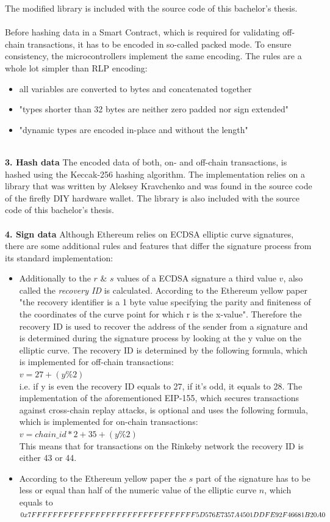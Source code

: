 The modified library is included with the source code of this bachelor's thesis.
\\\\
Before hashing data in a Smart Contract, which is required for validating off-chain transactions, it has to be encoded in so-called packed mode\cite{packed-spec}. To ensure consistency, the microcontrollers implement the same encoding. The rules are a whole lot simpler than RLP encoding:
\begin{itemize}
  \item all variables are converted to bytes and concatenated together
  \item "types shorter than 32 bytes are neither zero padded nor sign extended"
  \item "dynamic types are encoded in-place and without the length"
\end{itemize}
\leavevmode
\\
\textbf{3. Hash data}
The encoded data of both, on- and off-chain transactions, is hashed using the Keccak-256 hashing algorithm. The implementation relies on a library that was written by Aleksey Kravchenko and was found in the source code of the firefly DIY hardware wallet\cite{keccak-source}. The library is also included with the source code of this bachelor's thesis.
\\\\
\textbf{4. Sign data}
Although Ethereum relies on ECDSA elliptic curve signatures, there are some additional rules and features that differ the signature process from its standard implementation:
\begin{itemize}
  \item Additionally to the $r$ \& $s$ values of a ECDSA signature a third value $v$, also called the \textit{recovery ID} is calculated. According to the Ethereum yellow paper\cite{ethereum-yellow-paper} "the recovery identifier is a 1 byte value specifying the parity and finiteness of the coordinates of the curve point for which r is the x-value". Therefore the recovery ID is used to recover the address of the sender from a signature and is determined during the signature process by looking at the y value on the elliptic curve. The recovery ID is determined by the following formula, which is implemented for off-chain transactions:
\\
$v = 27 + (y \% 2)$
\\
i.e. if y is even the recovery ID equals to 27, if it's odd, it equals to 28. The implementation of the aforementioned EIP-155, which secures transactions against cross-chain replay attacks, is optional and uses the following formula, which is implemented for on-chain transactions:
\\
$v = chain\_id * 2 + 35 + (y \% 2)$
\\
This means that for transactions on the Rinkeby network the recovery ID is either 43 or 44.
  \item According to the Ethereum yellow paper\cite{ethereum-yellow-paper} the $s$ part of the signature has to be less or equal than half of the numeric value of the elliptic curve $n$, which equals to 
  $0x7FFFFFFFFFFFFFFFFFFFFFFFFFFF
  \\FFFF5D576E7357A4501DDFE92F46681B20A0$
\end{itemize}
